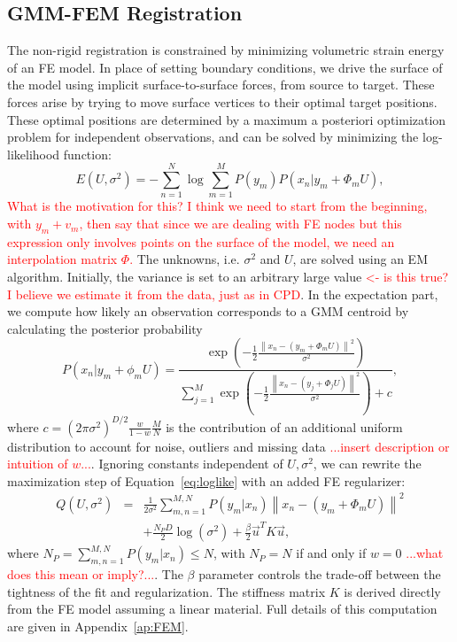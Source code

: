 \documentclass[journal]{IEEEtran}
\newcommand{\comment}[1]{\textcolor{red}{#1}}
\newcommand{\trans}[1]{#1^{\scriptscriptstyle T}}
\begin{document}
\subsection{GMM-FEM Registration}
The non-rigid registration is constrained by minimizing volumetric strain energy of an FE model. In place of setting boundary conditions, we drive the surface of the model using implicit surface-to-surface forces, from source to target. These forces arise by trying to move surface vertices to their optimal target positions.  These optimal positions are determined by a maximum a posteriori optimization problem for independent observations, and can be solved by minimizing the log-likelihood function: 
\begin{equation} \label{eq:loglike}
E(U,\sigma^2) = -\sum_{n=1}^N\log\sum_{m=1}^MP(y_m)P(x_n|y_m+\Phi_mU),
\end{equation}
\comment{What is the motivation for this?  I think we need to start from the beginning, with $y_m + v_m$, then say that since we are dealing with FE nodes but this expression only involves points on the surface of the model, we need an interpolation matrix $\Phi$.}  The unknowns, i.e. $\sigma^2$ and $U$, are solved using an EM algorithm. Initially, the variance is set to an arbitrary large value \comment{<- is this true?  I believe we estimate it from the data, just as in CPD}. In the expectation part, we compute how likely an observation corresponds to a GMM centroid by calculating the posterior probability
\begin{equation} \label{eq:prob}
P(x_n|y_m+\phi_mU) = \frac{\exp{\left(-\frac{1}{2}\frac{\left\|x_n -(y_m+\Phi_mU)\right\|^2}{\sigma^2}\right)}}{\sum_{j=1}^M\exp{\left(-\frac{1}{2}\frac{\left\|x_n -(y_j+\Phi_jU)\right\|^2}{\sigma^2}\right)} + c},
\end{equation}
where $c=(2\pi\sigma^2)^{D/2}\frac{w}{1-w}\frac{M}{N}$ is the contribution of an additional uniform distribution to account for noise, outliers and missing data \comment{...insert description or intuition of $w$...}. Ignoring constants independent of $U,\sigma^2$, we can rewrite the maximization step of Equation~\eqref{eq:loglike} with an added FE regularizer:
\begin{eqnarray} \label{eq:obj}
Q(U,\sigma^2) &=& \frac{1}{2\sigma^2}\sum_{m,n=1}^{M,N}P(y_m|x_n)\left\|x_n- (y_m+\Phi_mU)\right\|^2 \nonumber\\
&& + \frac{N_PD}{2}\log(\sigma^2) + \frac{\beta}{2}\trans{\vec{u}}K\vec{u},
\end{eqnarray}
where $N_P=\sum_{m,n=1}^{M,N}P(y_m|x_n){\leq}N$, with $N_P=N$ if and only if $w=0$ \comment{...what does this mean or imply?...}. The $\beta$ parameter controls the trade-off between the tightness of the fit and regularization. The stiffness matrix $K$ is derived directly from the FE model assuming a linear material.  Full details of this computation are given in Appendix~\ref{ap:FEM}. 
\end{document}
